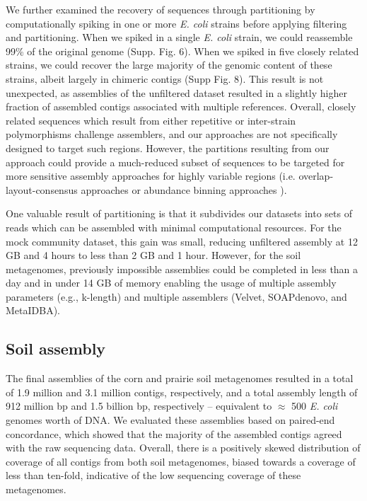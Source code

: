 \documentclass[11pt]{article} %
\begin{document}
We further examined the recovery of sequences through partitioning by
computationally spiking in one or more \emph{E. coli} strains before
applying filtering and partitioning.  When we spiked in a single
\emph{E. coli} strain, we could reassemble 99\% of the original genome
(Supp. Fig. 6).  When we spiked in five closely related strains,
we could recover the large majority of the genomic
content of these strains, albeit largely in chimeric contigs (Supp
Fig. 8).  This result is not unexpected, as
assemblies of the unfiltered dataset resulted in a slightly higher
fraction of assembled contigs associated with multiple references.
Overall, closely related sequences which result from either repetitive
or inter-strain polymorphisms challenge assemblers, and our
approaches are not specifically designed to target such regions.
However, the partitions resulting from our approach could provide a 
much-reduced subset of sequences to be
targeted for more sensitive assembly approaches for highly variable regions
(i.e. overlap-layout-consensus approaches or abundance binning
approaches \cite{Sharon:2012kx}).

One valuable result of partitioning is that it subdivides our datasets
into sets of reads which can be assembled with minimal
computational resources.  For the mock community dataset, this gain
was small, reducing unfiltered assembly at 12 GB and 4 hours to less
than 2 GB and 1 hour.  However, for the soil metagenomes, previously
impossible assemblies could be completed in less than a day and in
under 14 GB of memory enabling the usage of multiple assembly
parameters (e.g., k-length) and multiple assemblers (Velvet,
SOAPdenovo, and MetaIDBA).

\subsection{Soil assembly}

The final assemblies of the corn and prairie soil metagenomes resulted
in a total of 1.9 million and 3.1 million contigs, respectively, and a
total assembly length of 912 million bp and 1.5 billion bp,
respectively -- equivalent to $\approx$ 500 \emph{E. coli} genomes worth of DNA.  We evaluated these assemblies based on paired-end concordance, which showed that the majority of the assembled contigs agreed with the raw sequencing data.  Overall,
there is a positively skewed distribution of coverage of all contigs
from both soil metagenomes, biased towards a coverage of less than
ten-fold, indicative of the low sequencing coverage of these
metagenomes.
\end{document}
